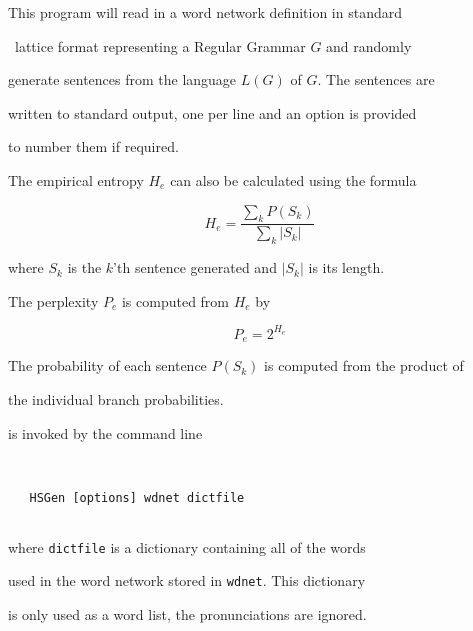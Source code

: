 This program will read in a word network definition in standard 


\HTK\ lattice format representing a Regular Grammar $G$ and randomly


generate sentences from the language $L(G)$ of $G$.  The sentences are


written to standard output, one per line and an option is provided


to number them if required.





The empirical entropy $H_e$ can also be calculated using the formula


\begin{equation}


  H_e = \frac{\sum_k P(S_k)}{\sum_k |S_k|}


\end{equation}


where $S_k$ is the $k$'th sentence generated and $|S_k|$ is its length.


The perplexity $P_e$ is computed from $H_e$ by


\begin{equation}


  P_e = 2^{H_e}


\end{equation}


The probability of each sentence $P(S_k)$ is computed from the product of


the individual branch probabilities.













 is invoked by the command line


\begin{verbatim}


   HSGen [options] wdnet dictfile


\end{verbatim}


where \texttt{dictfile} is a dictionary containing all of the words


used in the word network stored in \texttt{wdnet}.  This dictionary


is only used as a word list, the pronunciations are ignored.






